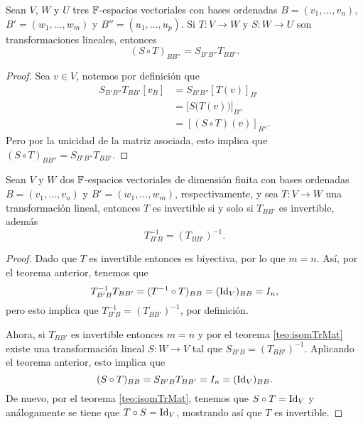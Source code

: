\begin{teor}
  Sean $V$, $W$ y $U$ tres $\mathbb{F}$-espacios vectoriales con bases ordenadas $B = (v_1,\ldots,v_n)$, $B' = (w_1,\ldots,w_m)$ y $B'' = (u_1,\ldots,u_p)$. Si $T\colon V \to W$ y $S\colon W \to U$ son transformaciones lineales, entonces
  \[ (S \circ T)_{BB''} = S_{B'B''} T_{BB'}. \]
\end{teor}
\begin{proof}
  Sea $v \in V$, notemos por definición que
    \begin{align*}
      S_{B'B''} T_{BB'}[v_B] &= S_{B'B''}[T(v)]_{B'} \\
        &= \bigl[ S\bigl(T(v)\bigr) \bigr]_{B''} \\
        &= [(S\circ T)(v)]_{B''}.
    \end{align*}
  Pero por la unicidad de la matriz asociada, esto implica que $(S \circ T)_{BB''} = S_{B'B''} T_{BB'}$.
\end{proof}

\begin{coro}
  Sean $V$ y $W$ dos $\mathbb{F}$-espacios vectoriales de dimensión finita con bases ordenadas $B = (v_1,\ldots,v_n)$ y $B' = (w_1,\ldots,w_m)$, respectivamente, y sea $T\colon V \to W$ una transformación lineal, entonces $T$ es invertible si y solo si $T_{BB'}$ es invertible, además
    \[ T_{B'B}^{-1} = (T_{BB'})^{-1}. \]
\end{coro}
\begin{proof}
  Dado que $T$ es invertible entonces es biyectiva, por lo que $m = n$. Así, por el teorema anterior, tenemos que
  \[ T^{-1}_{B'B} T_{BB'} = (T^{-1}\circ T)_{BB} = (\mathrm{Id}_V)_{BB} = I_n, \]
  pero esto impĺica que $T_{B'B}^{-1} = (T_{BB'})^{-1}$, por definición.

  Ahora, si $T_{BB'}$ es invertible entonces $m = n$ y por el teorema \ref{teo:isomTrMat} existe una transformación lineal $S\colon W \to V$ tal que $S_{B'B} =  (T_{BB'})^{-1}$. Aplicando el teorema anterior, esto implica que
    \[ (S \circ T)_{BB} =  S_{B'B}T_{BB'} = I_n = (\mathrm{Id}_V)_{BB}. \]
  De nuevo, por el teorema \ref{teo:isomTrMat}, tenemos que $S \circ T = \mathrm{Id}_{V}$ y análogamente se tiene que $T \circ S = \mathrm{Id}_{V}$, mostrando así que $T$ es invertible.
\end{proof}


\ExerciseSection

